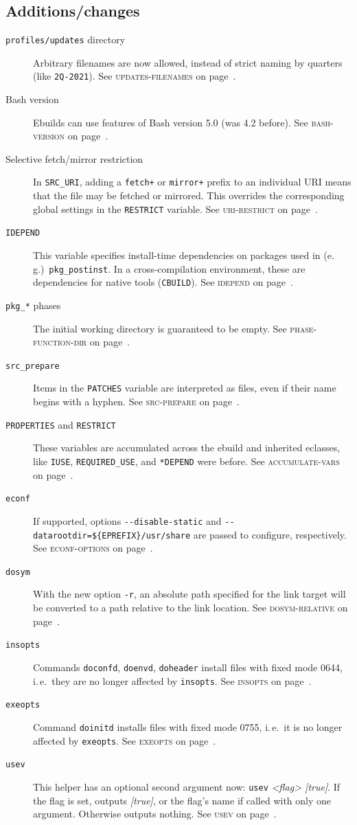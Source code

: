 \documentclass[a4paper,nofoldmark]{leaflet}
\newcommand{\code}[1]{\texttt{#1}}
\newcommand{\featureref}[1]{\textsc{#1} on page~\pageref{feat:#1}}
\begin{document}
\subsection{Additions/changes}
\label{sec:cs:eapi8-additions}
\begin{description}
    \item[\code{profiles/updates} directory] Arbitrary filenames
    are now allowed, instead of strict naming by quarters
    (like \code{2Q-2021}). See \featureref{updates-filenames}.
    \item[Bash version] Ebuilds can use features of Bash version 5.0
    (was 4.2 before). See \featureref{bash-version}.
    \item[Selective fetch/mirror restriction] In \code{SRC_URI},
    adding a \code{fetch+} or \code{mirror+} prefix to an individual
    URI means that the file may be fetched or mirrored. This overrides
    the corresponding global settings in the \code{RESTRICT} variable.
    See \featureref{uri-restrict}.
    \item[\code{IDEPEND}] This variable specifies install-time
    dependencies on packages used in (e.\,g.)\ \code{pkg_postinst}.
    In a cross-compilation environment, these are dependencies for
    native tools (\code{CBUILD}). See \featureref{idepend}.
    \item[\code{pkg_*} phases] The initial working directory is
    guaranteed to be empty. See \featureref{phase-function-dir}.
    \item[\code{src_prepare}] Items in the \code{PATCHES} variable are
    interpreted as files, even if their name begins with a hyphen.
    See \featureref{src-prepare}.
    \item[\code{PROPERTIES} and \code{RESTRICT}] These variables are
    accumulated across the ebuild and inherited eclasses, like
    \code{IUSE}, \code{REQUIRED\_USE}, and \code{*DEPEND} were before.
    See \featureref{accumulate-vars}.
    \item[\code{econf}] If supported, options
    \code{-{}-disable-static} and
    \code{-{}-datarootdir=\$\{EPREFIX\}/usr/share} are passed
    to configure, respectively. See \featureref{econf-options}.
    \item[\code{dosym}] With the new option \code{-r}, an absolute
    path specified for the link target will be converted to a path
    relative to the link location. See \featureref{dosym-relative}.
    \item[\code{insopts}] Commands \code{doconfd}, \code{doenvd},
    \code{doheader} install files with fixed mode 0644, i.\,e.\
    they are no longer affected by \code{insopts}.
    See \featureref{insopts}.
    \item[\code{exeopts}] Command \code{doinitd} installs files
    with fixed mode 0755, i.\,e.\ it is no longer affected by
    \code{exeopts}. See \featureref{exeopts}.
    \item[\code{usev}] This helper has an optional second argument
    now: \code{usev} \emph{<flag> [true]}. If the flag is set,
    outputs \emph{[true]}, or the flag's name if called with only one
    argument. Otherwise outputs nothing. See \featureref{usev}.
\end{description}
\end{document}
